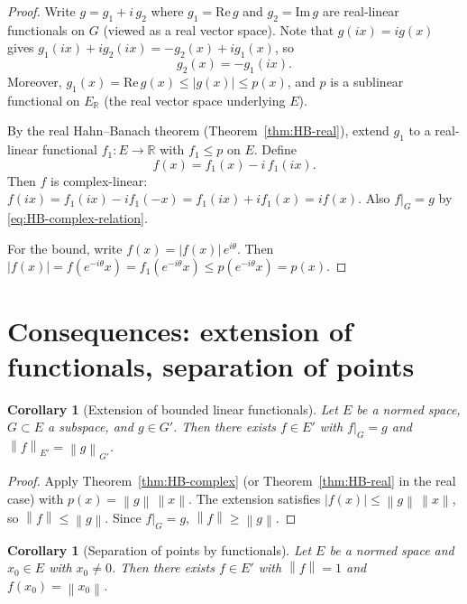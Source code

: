 \documentclass[a4paper,12pt]{book}
\newcommand{\R}{\mathbb{R}}
\newcommand{\norm}[1]{\left\| #1 \right\|}
\newcommand{\abs}[1]{\left| #1 \right|}
\theoremstyle{definition}
\theoremstyle{plain}
\newtheorem{corollary}[definition]{Corollary}
\theoremstyle{remark}
\begin{document}
\begin{proof}
Write $g = g_1 + i\,g_2$ where $g_1=\mathrm{Re}\,g$ and $g_2=\mathrm{Im}\,g$
are real-linear functionals on $G$ (viewed as a real vector space). Note that
$g(ix) = ig(x)$ gives $g_1(ix)+ig_2(ix) = -g_2(x)+ig_1(x)$, so
\begin{equation}\label{eq:HB-complex-relation}
  g_2(x) = -g_1(ix).
\end{equation}
Moreover, $g_1(x) = \mathrm{Re}\,g(x)\leq\abs{g(x)}\leq p(x)$, and $p$ is a
sublinear functional on $E_{\R}$ (the real vector space underlying $E$).

By the real Hahn--Banach theorem (Theorem~\ref{thm:HB-real}), extend $g_1$ to a
real-linear functional $f_1\colon E\to\R$ with $f_1\leq p$ on $E$. Define
\[
  f(x) = f_1(x) - i\,f_1(ix).
\]
Then $f$ is complex-linear: $f(ix) = f_1(ix)-if_1(-x) = f_1(ix)+if_1(x) = if(x)$.
Also $f|_G = g$ by \eqref{eq:HB-complex-relation}.

For the bound, write $f(x) = \abs{f(x)}\,e^{i\theta}$. Then
$\abs{f(x)} = f(e^{-i\theta}x) = f_1(e^{-i\theta}x) \leq p(e^{-i\theta}x) = p(x)$.
\end{proof}

\section{Consequences: extension of functionals, separation of points}

\begin{corollary}[Extension of bounded linear functionals]
\label{cor:HB-extension}
Let $E$ be a normed space, $G\subset E$ a subspace, and $g\in G'$. Then there
exists $f\in E'$ with $f|_G = g$ and $\norm{f}_{E'} = \norm{g}_{G'}$.
\end{corollary}

\begin{proof}
Apply Theorem~\ref{thm:HB-complex} (or Theorem~\ref{thm:HB-real} in the real
case) with $p(x) = \norm{g}\,\norm{x}$. The extension satisfies
$\abs{f(x)}\leq\norm{g}\,\norm{x}$, so $\norm{f}\leq\norm{g}$. Since
$f|_G=g$, $\norm{f}\geq\norm{g}$.
\end{proof}

\begin{corollary}[Separation of points by functionals]\label{cor:HB-separation-points}
Let $E$ be a normed space and $x_0\in E$ with $x_0\neq 0$. Then there exists
$f\in E'$ with $\norm{f}=1$ and $f(x_0)=\norm{x_0}$.
\end{corollary}
\end{document}
